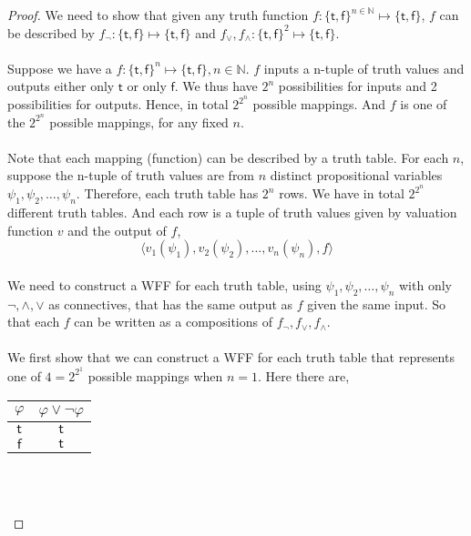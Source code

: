 \documentclass[12pt]{article}
\begin{document}
\begin{proof}
    We need to show that given any truth function $f \colon \{\mathsf{t}, \mathsf{f}\}^{n \in \mathbb{N}} \longmapsto \{\mathsf{t}, \mathsf{f}\}$, $f$ can be described by $f_{\neg} \colon \{\mathsf{t}, \mathsf{f}\} \longmapsto \{\mathsf{t}, \mathsf{f}\} $ and $f_{\lor}, f_{\land} \colon \{\mathsf{t}, \mathsf{f}\}^2 \longmapsto \{\mathsf{t}, \mathsf{f}\}$.\\
    \\
    Suppose we have a $f \colon \{\mathsf{t}, \mathsf{f}\}^n \longmapsto \{\mathsf{t}, \mathsf{f}\}, n \in \mathbb{N}$.
    $f$ inputs a n-tuple of truth values and outputs either only $\mathsf{t}$ or only $\mathsf{f}$.
    We thus have $2^n$ possibilities for inputs and 2 possibilities for outputs. 
    Hence, in total $2^{2^n}$ possible mappings.
    And $f$ is one of the $2^{2^n}$ possible mappings, for any fixed $n$.\\
    \\
    Note that each mapping (function) can be described by a truth table.
    For each $n$, suppose the n-tuple of truth values are from $n$ distinct propositional variables $\psi_1, \psi_2, \dots, \psi_n$.
    Therefore, each truth table has $2^n$ rows.
    We have in total $2^{2^n}$ different truth tables.
    And each row is a tuple of truth values given by valuation function $v$ and the output of $f$,
    $$\langle v_1(\psi_1), v_2(\psi_2), \dots, v_n(\psi_n), f \rangle$$
    \\
    We need to construct a WFF for each truth table, using $\psi_1, \psi_2, \dots, \psi_n$ with only $\neg, \land, \lor$ as connectives, that has the same output as $f$ given the same input.
    So that each $f$ can be written as a compositions of $f_{\neg}, f_{\lor}, f_{\land}$.\\
    \\
    We first show that we can construct a WFF for each truth table that represents one of $4 = 2^{2^1}$ possible mappings when $n = 1$.
    Here there are,
    \begin{center}
        \begin{tabular}{c|c}
            $\varphi$ & $\varphi \lor \neg \varphi$\\ \hline
            $\mathsf{t}$ & $\mathsf{t}$\\
            $\mathsf{f}$ & $\mathsf{t}$\\
        \end{tabular}
        ~~~
        \begin{tabular}{c|c}

\end{tabular}
\end{center}
\end{proof}
\end{document}
